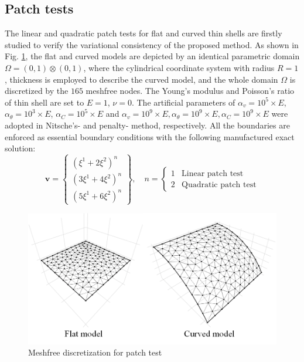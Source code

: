 \subsection{Patch tests}
The linear and quadratic patch tests for flat and curved thin shells are firstly studied to verify the variational consistency of the proposed method. As shown in Fig. \ref{ptf1}, the flat and curved models are depicted by an identical parametric domain $\Omega = (0,1)\otimes(0,1)$, where the cylindrical coordinate system with radius $R=1$, thickness \DIFdelbegin {}\DIFdelend \DIFaddbegin {}\DIFaddend is employed to describe the curved model, and the whole domain $\Omega$ is discretized by the $165$ meshfree nodes. The Young's modulus and Poisson's ratio of thin shell are set to $E=1$, $\nu=0$. The artificial parameters of $\alpha_v=10^5\times E$, $\alpha_\theta=10^3\times E$, $\alpha_C=10^5\times E$ and $\alpha_v=10^9\times E, \alpha_\theta=10^9\times E, \alpha_C=10^9\times E$ were adopted in Nitsche's- and penalty- method, respectively. All the boundaries are enforced as essential boundary conditions with the following manufactured exact solution:
\begin{equation}
\boldsymbol v = \begin{Bmatrix}
(\xi^1+2\xi^2)^n \\ (3\xi^1+4\xi^2)^n \\ (5\xi^1+6\xi^2)^n
\end{Bmatrix},\quad
n = \begin{cases}
1 & \text{Linear patch test} \\
2 & \text{Quadratic patch test}
\end{cases}
\end{equation}

\begin{figure}[!ht]
    \centering
    \includegraphics[width=\textwidth]{figures/ptmsh}
    \caption{Meshfree discretization for patch test}\label{ptf1}
\end{figure}

